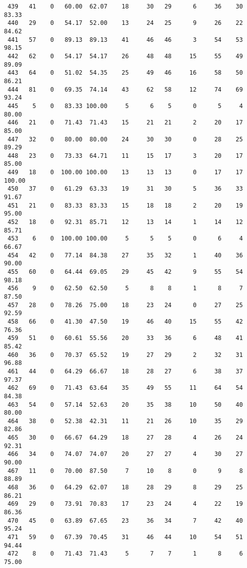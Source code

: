 \begin{verbatim}
 439   41    0   60.00  62.07    18     30   29      6     36    30    83.33
 440   29    0   54.17  52.00    13     24   25      9     26    22    84.62
 441   57    0   89.13  89.13    41     46   46      3     54    53    98.15
 442   62    0   54.17  54.17    26     48   48     15     55    49    89.09
 443   64    0   51.02  54.35    25     49   46     16     58    50    86.21
 444   81    0   69.35  74.14    43     62   58     12     74    69    93.24
 445    5    0   83.33 100.00     5      6    5      0      5     4    80.00
 446   21    0   71.43  71.43    15     21   21      2     20    17    85.00
 447   32    0   80.00  80.00    24     30   30      0     28    25    89.29
 448   23    0   73.33  64.71    11     15   17      3     20    17    85.00
 449   18    0  100.00 100.00    13     13   13      0     17    17   100.00
 450   37    0   61.29  63.33    19     31   30      5     36    33    91.67
 451   21    0   83.33  83.33    15     18   18      2     20    19    95.00
 452   18    0   92.31  85.71    12     13   14      1     14    12    85.71
 453    6    0  100.00 100.00     5      5    5      0      6     4    66.67
 454   42    0   77.14  84.38    27     35   32      1     40    36    90.00
 455   60    0   64.44  69.05    29     45   42      9     55    54    98.18
 456    9    0   62.50  62.50     5      8    8      1      8     7    87.50
 457   28    0   78.26  75.00    18     23   24      0     27    25    92.59
 458   66    0   41.30  47.50    19     46   40     15     55    42    76.36
 459   51    0   60.61  55.56    20     33   36      6     48    41    85.42
 460   36    0   70.37  65.52    19     27   29      2     32    31    96.88
 461   44    0   64.29  66.67    18     28   27      6     38    37    97.37
 462   69    0   71.43  63.64    35     49   55     11     64    54    84.38
 463   54    0   57.14  52.63    20     35   38     10     50    40    80.00
 464   38    0   52.38  42.31    11     21   26     10     35    29    82.86
 465   30    0   66.67  64.29    18     27   28      4     26    24    92.31
 466   34    0   74.07  74.07    20     27   27      4     30    27    90.00
 467   11    0   70.00  87.50     7     10    8      0      9     8    88.89
 468   36    0   64.29  62.07    18     28   29      8     29    25    86.21
 469   29    0   73.91  70.83    17     23   24      4     22    19    86.36
 470   45    0   63.89  67.65    23     36   34      7     42    40    95.24
 471   59    0   67.39  70.45    31     46   44     10     54    51    94.44
 472    8    0   71.43  71.43     5      7    7      1      8     6    75.00

\end{verbatim}
